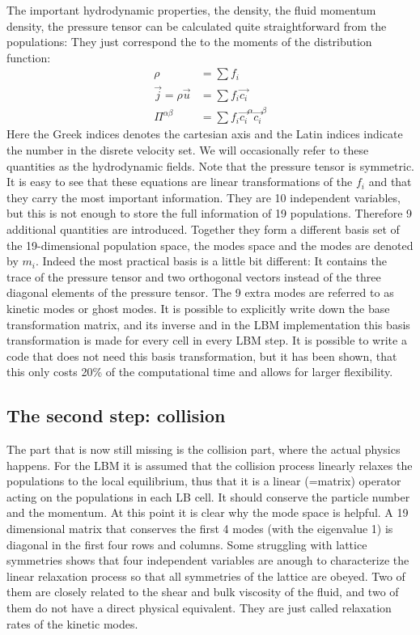 The important hydrodynamic properties, the density, 
the fluid momentum density,
the pressure tensor can be calculated quite straightforward from
the populations: They just correspond the to the moments
of the distribution function: 
\begin{align}
  \rho &= \sum f_i \\
  \vec{j} = \rho \vec{u} &= \sum f_i \vec{c_i} \\
  \Pi^{\alpha \beta} &= \sum f_i \vec{c_i}^{\alpha}\vec{c_i}^{\beta} 
  \label{eq:fields}
\end{align}
Here the Greek indices denotes the cartesian axis and the
Latin indices indicate the number in the disrete velocity set.
We will occasionally refer to these quantities as the hydrodynamic fields.
Note that the pressure tensor is symmetric.
It is easy to see that these equations are linear transformations
of the $f_i$ and that they carry the most important information. They
are 10 independent variables, but this is not enough to store the
full information of 19 populations. Therefore 9 additional quantities
are introduced. Together they form a different basis set of the
19-dimensional population space, the modes space and the modes are denoted by 
$m_i$. Indeed the most practical basis is a little bit different:
It contains the trace of the pressure tensor and two orthogonal 
vectors instead of the three diagonal elements of the pressure 
tensor. The 9 extra modes are referred to as kinetic modes or
ghost modes. It is possible to explicitly write down the 
base transformation matrix, and its inverse and in the \ES{}
LBM implementation this basis transformation is made for every
cell in every LBM step. It is possible to write a code that does not
need this basis transformation, but it has been shown, that this
only costs 20\% of the computational time and allows for 
larger flexibility.

\subsection*{The second step: collision}

The part that is now still missing is the collision part, where
the actual physics happens. For the LBM it is assumed that
the collision process linearly relaxes the populations to the local
equilibrium, thus that it is a linear (=matrix) operator 
acting on the populations in each LB cell. It should conserve 
the particle number and the momentum. At this point it is clear
why the mode space is helpful. A 19 dimensional matrix that
conserves the first 4 modes (with the eigenvalue 1) is diagonal in the
first four rows and columns.
Some struggling with lattice symmetries shows that four independent
variables are anough to characterize the linear relaxation
process so that all symmetries of the lattice are obeyed. 
Two of them are closely related to 
the shear and bulk viscosity of the fluid, and two of them
do not have a direct physical equivalent. They are just called
relaxation rates of the kinetic modes.


